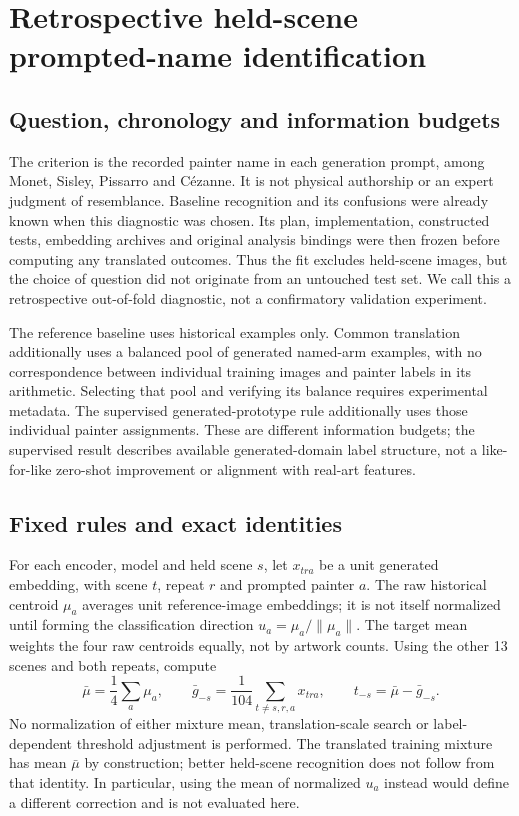 \clearpage
\section{Retrospective held-scene prompted-name identification}
\label{app:transfer}

\subsection{Question, chronology and information budgets}
The criterion is the recorded painter name in each generation prompt, among
Monet, Sisley, Pissarro and C\'ezanne. It is not physical authorship or an expert
judgment of resemblance. Baseline recognition and its confusions were already
known when this diagnostic was chosen. Its plan, implementation, constructed
tests, embedding archives and original analysis bindings were then frozen
before computing any translated outcomes. Thus the fit excludes held-scene
images, but the choice of question did not originate from an untouched test
set. We call this a retrospective out-of-fold diagnostic, not a confirmatory
validation experiment.

The reference baseline uses historical examples only. Common translation
additionally uses a balanced pool of generated named-arm examples, with no
correspondence between individual training images and painter labels in its
arithmetic. Selecting that pool and verifying its balance requires experimental
metadata. The supervised generated-prototype rule additionally uses those
individual painter assignments. These are different information budgets;
the supervised result describes available generated-domain label structure,
not a like-for-like zero-shot improvement or alignment with real-art features.

\subsection{Fixed rules and exact identities}
For each encoder, model and held scene $s$, let $x_{tra}$ be a unit generated
embedding, with scene $t$, repeat $r$ and prompted painter $a$. The raw historical
centroid $\mu_a$ averages unit reference-image embeddings; it is not itself
normalized until forming the classification direction $u_a=\mu_a/\|\mu_a\|$.
The target mean weights the four raw centroids equally, not by artwork counts.
Using the other 13 scenes and both repeats, compute
\begin{equation}
 \bar\mu=\frac14\sum_a\mu_a,\qquad
 \bar g_{-s}=\frac1{104}\sum_{t\ne s,r,a}x_{tra},\qquad
 t_{-s}=\bar\mu-\bar g_{-s}.
\end{equation}
No normalization of either mixture mean, translation-scale search or
label-dependent threshold adjustment is performed. The translated training
mixture has mean $\bar\mu$ by construction; better held-scene recognition does
not follow from that identity. In particular, using the mean of normalized
$u_a$ instead would define a different correction and is not evaluated here.

